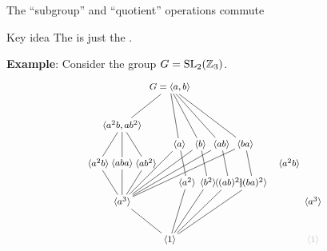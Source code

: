 \documentclass[8pt, handout]{beamer}
\newcommand{\Pause}{}      %
\begin{document}

\begin{frame}{The ``subgroup'' and ``quotient'' operations commute} 
  
  \begin{alertblock}{Key idea}
    The  is just the .
  \end{alertblock}

  \medskip\Pause
  
  \textbf{Example}: Consider the group $G=\operatorname{SL}_2(\mathbb{Z}_3)$.
  \[
  \hspace*{-2mm}
  \begin{tikzpicture}[node distance=1cm,shorten >= -2pt, shorten <= -2pt,scale=.6]
    \begin{scope}[shift={(0,0)}]
      \tikzstyle{every node}=[font=\footnotesize]
      \node (1) {$\<1\>$};
      \node (a3) at (-2.5,2) {$\<a^3\>$};
      \node (a2) at (.9,3) {$\<a^2\>$};
      \node (b2) at (2,3) {$\<b^2\>$};
      \node (abab) at (3.1,3) {$\<(ab)^2\>$};
      \node (baba) at (4.35,3) {$\<(ba)^2\>$};
      \node (a2b) at (-3.75,4) {$\<a^2b\>$};
      \node (aba) at (-2.5,4) {$\<aba\>$};
      \node (ab2) at (-1.25,4) {$\<ab^2\>$};
      \node (a) at (.5,5) {$\<a\>$};
      \node (b) at (1.6,5) {$\<b\>$};
      \node (ab) at (2.7,5) {$\<ab\>$};
      \node (ba) at (3.95,5) {$\<ba\>$};
      \node (a2b-ab2) at (-2.5,6) {$\<a^2b,ab^2\>$};
      \node (G) at (0,8) {$G=\<a,b\>$};
      \draw (1) -- (a3);
      \draw (1) -- (a2);
      \draw (1) -- (b2);
      \draw (1) -- (abab);
      \draw (1) -- (baba);
      \draw (a3) -- (a2b);
      \draw (a3) -- (aba);
      \draw (a3) -- (ab2);
      \draw (a3) -- (a);
      \draw (a3) -- (b);
      \draw (a3) -- (ab);
      \draw (a3) -- (ba);
      \draw (a2) -- (a);
      \draw (b2) -- (b);
      \draw (abab) -- (ab);
      \draw (baba) -- (ba);
      \draw (a2b) -- (a2b-ab2);
      \draw (aba) -- (a2b-ab2);
      \draw (ab2) -- (a2b-ab2);
      \draw (G) -- (a2b-ab2);
      \draw (G) -- (a);
      \draw (G) -- (b);
      \draw (G) -- (ab);
      \draw (G) -- (ba);
    \end{scope}
    \begin{scope}[shift={(10,0)}]
      \tikzstyle{every node}=[font=\footnotesize]
      \node (1) at (-2.5,0) {\color{faded}$\<1\>$};
      \node (a3) at (-2.5,2) {$\<a^3\>$};
      \node (a2b) at (-3.75,4) {$\<a^2b\>$};

\end{scope}
\end{tikzpicture}\]
\end{frame}
\end{document}
